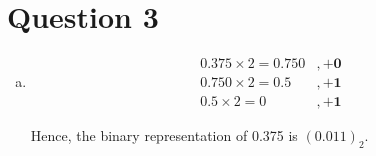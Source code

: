 \documentclass[12pt]{article}
\begin{document}
\section*{Question 3}
\begin{enumerate}[a.]
    \item

    \begin{align*}
        0.375 \times 2 = 0.750 &, + \textbf{0}\\
        0.750 \times 2 = 0.5 &, + \textbf{1}\\
        0.5 \times 2 = 0 &, + \textbf{1}
    \end{align*}

    Hence, the binary representation of 0.375 is $(0.011)_2$.

\end{enumerate}
\end{document}

